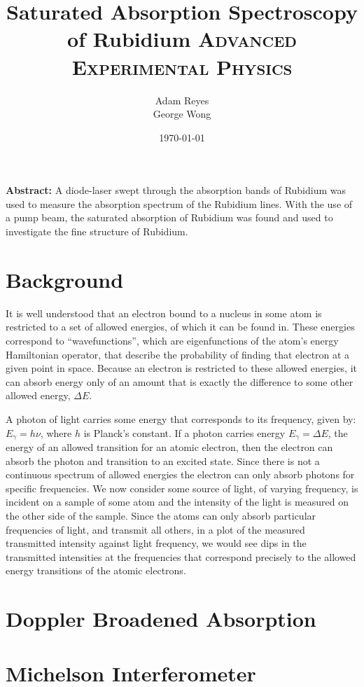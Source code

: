 \documentclass[paper=a4, fontsize=11pt]{scrartcl} %
\title{	
Saturated Absorption Spectroscopy of Rubidium
\horrule{0.5pt}
\normalfont \normalsize 
\textsc{Advanced Experimental Physics }
}
\author{Adam Reyes \\ George Wong} %
\date{\normalsize\today} %
\numberwithin{equation}{section}
\numberwithin{figure}{section}
\numberwithin{table}{section}
\begin{document}
\maketitle
\noindent\textbf{Abstract:}
A diode-laser swept through the absorption bands of Rubidium was used
to measure the absorption spectrum of the Rubidium lines. With the use
of a pump beam, the saturated absorption of Rubidium was found and
used to investigate the fine structure of Rubidium. 


\section{Background}


\indent It is well understood that an electron bound to a nucleus in some atom is restricted to a set of allowed energies, of which it can be found in. These energies correspond to ``wavefunctions'', which are eigenfunctions of the atom's energy Hamiltonian operator, that describe the probability of finding that electron at a given point in space. Because an electron is restricted to these allowed energies, it can absorb energy only of an amount that is exactly the difference to some other allowed energy, $\Delta E$. 

A photon of light carries some energy that corresponds to its frequency, given by: $E_\gamma = h\nu$, where $h$ is Planck's constant. If a photon carries energy $E_\gamma = \Delta E$, the energy of an allowed transition for an atomic electron, then the electron can absorb the photon and transition to an excited state. Since there is not a continuous spectrum of allowed energies the electron can only absorb photons for specific frequencies. We now consider some source of light, of varying frequency, is incident on a sample of some atom and the intensity of the light is measured on the other side of the sample. Since the atoms can only absorb particular frequencies of light, and transmit all others, in a plot of the measured transmitted intensity against light frequency, we would see dips in the transmitted intensities at the frequencies that correspond precisely to the allowed energy transitions of the atomic electrons. 



\section{Doppler Broadened Absorption}
\label{sec:broad}

\section{Michelson Interferometer}
\end{document}
